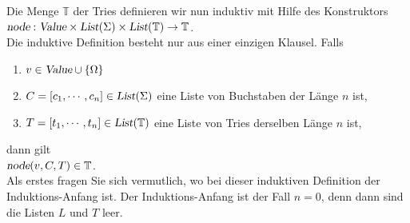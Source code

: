 Die Menge $\mathbb{T}$ der Tries definieren wir nun induktiv mit Hilfe des 
Konstruktors \\[0.2cm]
\hspace*{1.3cm} 
$\textsl{node}: \textsl{Value} \times \textsl{List}(\Sigma) \times
\textsl{List}(\mathbb{T}) \rightarrow \mathbb{T}$. \\[0.2cm]
Die induktive Definition besteht nur aus einer einzigen Klausel. Falls
\begin{enumerate}
\item $v \in \textsl{Value} \cup \{\Omega\}$
\item $C = [c_1, \cdots, c_n] \in \textsl{List}(\Sigma)$ eine Liste von Buchstaben der
      L\"ange $n$ ist,
\item $T = [t_1, \cdots, t_n] \in \textsl{List}(\mathbb{T})$ eine Liste von Tries derselben L\"ange $n$ ist, 
\end{enumerate}
dann gilt \\[0.2cm]
\hspace*{1.3cm}  $\textsl{node}(v, C, T) \in \mathbb{T}$.  \\[0.2cm]
Als erstes fragen Sie sich
vermutlich, wo bei dieser induktiven Definition der Induktions-Anfang ist.
Der Induktions-Anfang ist der Fall $n=0$, denn dann sind die Listen $L$ und $T$ leer.

